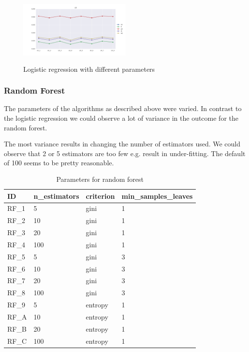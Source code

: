 \documentclass{sig-alternate-05-2015}
\begin{document}
\begin{figure}[h]
  \centering
  \caption{Logistic regression with different parameters}
  \includegraphics[width=0.5\textwidth]{../plots/LR_compare_param}
  \label{fig:lr}
\end{figure}

\subsubsection{Random Forest}
The parameters of the algorithms as described above were varied.
In contrast to the logistic regression we could observe a lot of variance in the outcome for the random forest.

The most variance results in changing the number of estimators used. We could observe that 2 or 5 estimators are too few e.g. result in under-fitting. The default of 100 seems to be pretty reasonable.

\begin{table}[]
\centering
\caption{Parameters for random forest}
\label{rf-table}
\begin{tabular}{|l|l|l|l|}
\hline
ID & n\_estimators & criterion & min\_samples\_leaves \\ \hline
RF\_1                    & 5             & gini      & 1                    \\ \hline
RF\_2                    & 10            & gini      & 1                    \\ \hline
RF\_3                    & 20            & gini      & 1                    \\ \hline
RF\_4                    & 100            & gini      & 1                    \\ \hline
RF\_5                    & 5             & gini      & 3                    \\ \hline
RF\_6                    & 10            & gini      & 3                    \\ \hline
RF\_7                    & 20            & gini      & 3                    \\ \hline
RF\_8                    & 100            & gini      & 3                    \\ \hline
RF\_9                    & 5             & entropy      & 1                    \\ \hline
RF\_A                    & 10            & entropy      & 1                    \\ \hline
RF\_B                    & 20            & entropy      & 1                    \\ \hline
RF\_C                    & 100            & entropy      & 1                    
\\ \hline
\end{tabular}
\end{table}
\end{document}
